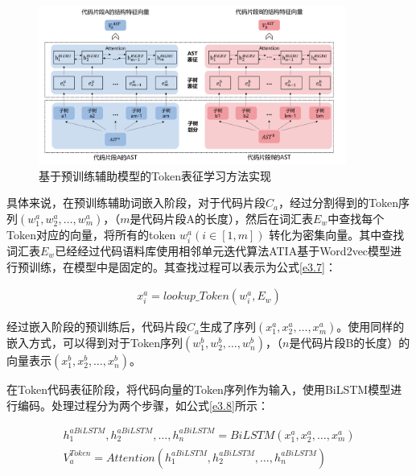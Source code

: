 \begin{figure}[H]
  \centering
  \includegraphics[width=0.9\textwidth]{figures/token}
  \caption{基于预训练辅助模型的Token表征学习方法实现}\label{fig:token}
\end{figure}

具体来说，在预训练辅助词嵌入阶段，对于代码片段$C_{a}$，经过分割得到的Token序列$\left( w_{1}^{a},w_{2}^{a},\ldots,w_{m}^{a}\right)$，（$m$是代码片段A的长度），然后在词汇表$E_{w}$中查找每个Token对应的向量，将所有的token $w_{i}^{a} \left(i \in [1,m]\right)$ 转化为密集向量。其中查找词汇表$E_{w}$已经经过代码语料库使用相邻单元迭代算法ATIA基于Word2vec模型进行预训练，在模型中是固定的。其查找过程可以表示为公式\ref{e3.7}：

\begin{equation}\label{e3.7}
  \begin{split}
  x_{i}^{a} = lookup\_Token \left(w_{i}^{a} ,E_{w} \right)
  \end{split}
\end{equation}

经过嵌入阶段的预训练后，代码片段$C_{a}$生成了序列$\left( x_{1}^{a},x_{2}^{a},\ldots,x_{m}^{a}\right)$。使用同样的嵌入方式，可以得到对于Token序列$\left( w_{1}^{b},w_{2}^{b},\ldots,w_{n}^{b}\right)$，（$n$是代码片段B的长度）的向量表示$\left( x_{1}^{b},x_{2}^{b},\ldots,x_{n}^{b} \right)$。

在Token代码表征阶段，将代码向量的Token序列作为输入，使用BiLSTM模型进行编码。处理过程分为两个步骤，如公式\ref{e3.8}所示：

\begin{equation}\label{e3.8}
  \begin{split}
    h_{1}^{aBiLSTM},h_{2}^{aBiLSTM},\ldots,h_{n}^{aBiLSTM} = BiLSTM \left(x_{1}^{a},x_{2}^{a},\ldots,x_{m}^{a}\right) \\
    V_{a}^{Token} = Attention \left( h_{1}^{aBiLSTM},h_{2}^{aBiLSTM},\ldots,h_{n}^{aBiLSTM} \right)
  \end{split}
\end{equation}

